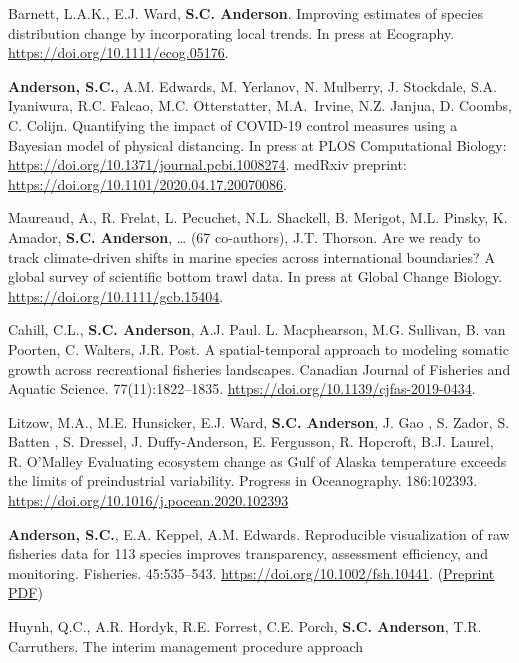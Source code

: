 \begin{description}
\tightlist
\item[2020]
Barnett, L.A.K., E.J. Ward, \textbf{S.C. Anderson}. Improving estimates
of species distribution change by incorporating local trends. In press
at Ecography. \url{https://doi.org/10.1111/ecog.05176}.
\item[2020]
\textbf{Anderson, S.C.}, A.M. Edwards, M. Yerlanov, N. Mulberry, J.
Stockdale, S.A. Iyaniwura, R.C. Falcao, M.C. Otterstatter, M.A.\ Irvine,
N.Z. Janjua, D. Coombs, C. Colijn. Quantifying the impact of COVID-19
control measures using a Bayesian model of physical distancing. In press
at PLOS Computational Biology:
\url{https://doi.org/10.1371/journal.pcbi.1008274}. medRxiv preprint:
\url{https://doi.org/10.1101/2020.04.17.20070086}.
\item[2020]
Maureaud, A., R. Frelat, L. Pecuchet, N.L. Shackell, B. Merigot, M.L.
Pinsky, K. Amador, \textbf{S.C. Anderson}, \ldots{} (67 co-authors),
J.T. Thorson. Are we ready to track climate-driven shifts in marine
species across international boundaries? A global survey of scientific
bottom trawl data. In press at Global Change Biology.
\url{https://doi.org/10.1111/gcb.15404}.
\item[2020]
Cahill, C.L., \textbf{S.C. Anderson}, A.J. Paul. L. Macphearson, M.G.
Sullivan, B. van Poorten, C. Walters, J.R. Post. A spatial-temporal
approach to modeling somatic growth across recreational fisheries
landscapes. Canadian Journal of Fisheries and Aquatic Science.
77(11):1822--1835. \url{https://doi.org/10.1139/cjfas-2019-0434}.
\item[2020]
Litzow, M.A., M.E. Hunsicker, E.J. Ward, \textbf{S.C. Anderson}, J. Gao
, S. Zador, S. Batten , S. Dressel, J. Duffy-Anderson, E. Fergusson, R.
Hopcroft, B.J. Laurel, R. O'Malley Evaluating ecosystem change as Gulf
of Alaska temperature exceeds the limits of preindustrial variability.
Progress in Oceanography. 186:102393.
\url{https://doi.org/10.1016/j.pocean.2020.102393}
\item[2020]
\textbf{Anderson, S.C.}, E.A. Keppel, A.M. Edwards. Reproducible
visualization of raw fisheries data for 113 species improves
transparency, assessment efficiency, and monitoring. Fisheries.
45:535--543. \url{https://doi.org/10.1002/fsh.10441}.
(\href{https://www.dropbox.com/s/4mmnomvmpg0dbky/Anderson_etal_2020_reproducible_visualization_preprint.pdf?dl=1}{Preprint
PDF})
\item[2020]
Huynh, Q.C., A.R. Hordyk, R.E. Forrest, C.E. Porch, \textbf{S.C.
Anderson}, T.R. Carruthers. The interim management procedure approach

\end{description}
